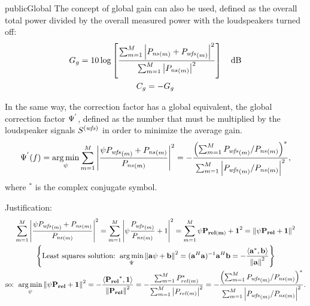 \begin{shownto}{publicGlobal}
	The concept of global gain can also be used, defined as the overall total power divided by the overall measured power with the loudspeakers turned off:
	\begin{gather}
		\globalGain = 10 \log \left[\frac{\sum_{m=1}^\numMeasPoints \abs{\Field[ns][frequency][scalar][m] + \Field[wfs][frequency][scalar][m]}^2}{\sum_{m=1}^\numMeasPoints \abs{\Field[ns][frequency][scalar][m]}^2}\right] \quad \si{dB}
		\\
		\globalCancellation = -\globalGain
	\end{gather}
\end{shownto}

In the same way, the correction factor has a global equivalent, the global correction factor $\Psi^{'}$, defined as the number that must be multiplied by the loudspeaker signals $\signal[wfs][frequency]$ in order to minimize the average gain.
\begin{equation}
\globalCorrectionFactorAverGain(f) = \argmin_{\psi} \sum_{m=1}^\numMeasPoints \abs{\frac{\psi \Field[wfs][frequency][scalar][m] + \Field[ns][frequency][scalar][m]}{\Field[ns][frequency][scalar][m]}}^2 
= -\frac{\left(\sum_{m=1}^\numMeasPoints \Field[wfs][frequency][scalar][m]/\Field[ns][frequency][scalar][m]\right)^*}{\sum_{m=1}^\numMeasPoints \abs{\Field[wfs][frequency][scalar][m]/\Field[ns][frequency][scalar][m]}^2},
\end{equation}
where $^*$ is the complex conjugate symbol.

Justification:
\begin{multline}
\sum_{m=1}^\numMeasPoints \abs{\frac{\psi \Field[wfs][frequency][scalar][m] + \Field[ns][frequency][scalar][m]}{\Field[ns][frequency][scalar][m]}}^2 
= \sum_{m=1}^\numMeasPoints \abs{\psi\frac{ \Field[wfs][frequency][scalar][m]}{\Field[ns][frequency][scalar][m]} + 1}^2
= \sum_{m=1}^\numMeasPoints \psi\vec{P_{rel(m)} + 1}^2 = \norm{\psi \vec{P_{rel}} + \vec{1}}^2 \\
\left\{\text{Least squares solution: } \argmin_{\Psi} \norm{\vec{a}\psi + \vec{b}}^2 = (\vec{a}^H \vec{a})^{-1} \vec{a}^H \vec{b} = -\frac{\scalarProd{\vec{a}^{*}}{\vec{b}}}{\norm{\vec{a}}^2}\right\} \\
\text{so: } \argmin_{\psi} \norm{\psi \vec{P_{rel}} + \vec{1}}^2 = -\frac{\scalarProd{\vec{\vec{P_{rel}}}^{*}}{\vec{1}}}{\norm{\vec{P_{rel}}}^2} = -\frac{\sum_{m=1}^\numMeasPoints P_{rel(m)}^*}{\sum_{m=1}^\numMeasPoints \abs{P_{rel(m)}}^2} = -\frac{\left(\sum_{m=1}^\numMeasPoints \Field[wfs][frequency][scalar][m]/\Field[ns][frequency][scalar][m]\right)^*}{\sum_{m=1}^\numMeasPoints \abs{\Field[wfs][frequency][scalar][m]/\Field[ns][frequency][scalar][m]}^2}.
\end{multline}


